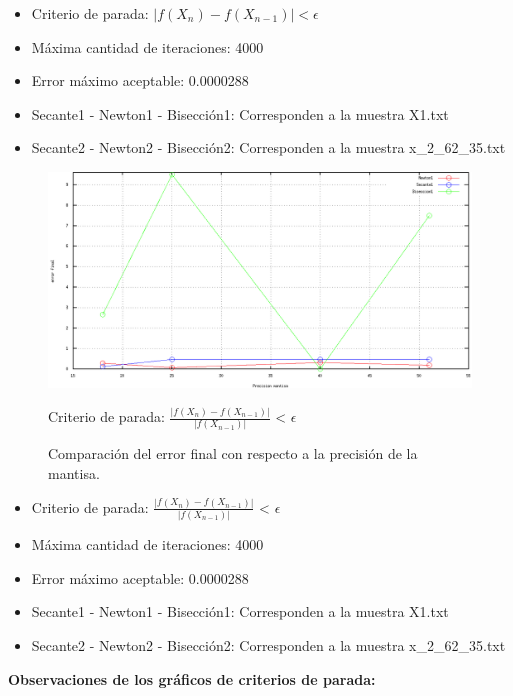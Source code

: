 \documentclass[10pt, a4paper]{article}
\begin{document}
\begin{itemize}
\item Criterio de parada: $|f(X_{n}) - f(X_{n-1})| < \epsilon$
\item M\'axima cantidad de iteraciones: 4000
\item Error m\'aximo aceptable: 0.0000288
\item Secante1 - Newton1 - Bisecci\'on1: Corresponden a la muestra X1.txt
\item Secante2 - Newton2 - Bisecci\'on2: Corresponden a la muestra x\_2\_62\_35.txt
\end{itemize}

\begin{figure}[H] %
\begin{center}
\includegraphics[width=370pt]{./error5.png}
\caption[h]{Comparaci\'on del error final con respecto a la precisi\'on de la mantisa.}{Criterio de parada: $\frac{|f(X_{n}) - f(X_{n-1})|}{|f(X_{n-1})|}$ < $\epsilon$}
\end{center}
\end{figure}

\begin{itemize}
\item Criterio de parada: $\frac{|f(X_{n}) - f(X_{n-1})|}{|f(X_{n-1})|}$ < $\epsilon$
\item M\'axima cantidad de iteraciones: 4000
\item Error m\'aximo aceptable: 0.0000288
\item Secante1 - Newton1 - Bisecci\'on1: Corresponden a la muestra X1.txt
\item Secante2 - Newton2 - Bisecci\'on2: Corresponden a la muestra x\_2\_62\_35.txt
\end{itemize}

\large{\textbf{Observaciones de los gr\'aficos de criterios de parada:}}\newline
\end{document}
